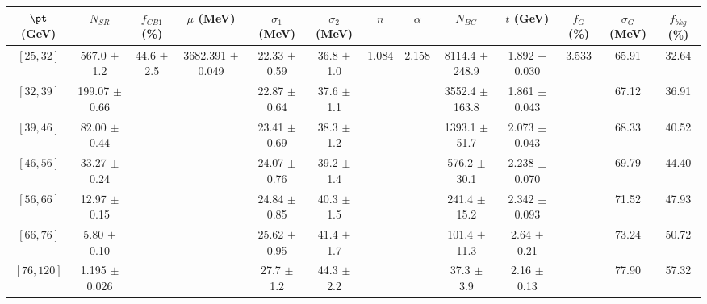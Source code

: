 \begin{tabular}{c||c|c|c|c|c|c|c|c|c|c|c||c}
$\pt$ (GeV) & $N_{SR}$ & $f_{CB1}$ (\%) & $\mu$ (MeV) & $\sigma_1$ (MeV) & $\sigma_2$ (MeV) & $n$ & $\alpha$ & $N_{BG}$ & $t$ (GeV) & $f_G$ (\%) & $\sigma_G$ (MeV) & $f_{bkg}$ (\%) \\
\hline
$[25, 32]$ & 567.0 $\pm$ 1.2 & \multirow{7}{*}{44.6 $\pm$ 2.5} & \multirow{7}{*}{3682.391 $\pm$ 0.049} & 22.33 $\pm$ 0.59 & 36.8 $\pm$ 1.0 & \multirow{7}{*}{1.084} & \multirow{7}{*}{2.158} & 8114.4 $\pm$ 248.9 & 1.892 $\pm$ 0.030 & \multirow{7}{*}{3.533} & 65.91 & 32.64\\
$[32, 39]$ & 199.07 $\pm$ 0.66 &  &  & 22.87 $\pm$ 0.64 & 37.6 $\pm$ 1.1 &  &  & 3552.4 $\pm$ 163.8 & 1.861 $\pm$ 0.043 &  & 67.12 & 36.91\\
$[39, 46]$ & 82.00 $\pm$ 0.44 &  &  & 23.41 $\pm$ 0.69 & 38.3 $\pm$ 1.2 &  &  & 1393.1 $\pm$ 51.7 & 2.073 $\pm$ 0.043 &  & 68.33 & 40.52\\
$[46, 56]$ & 33.27 $\pm$ 0.24 &  &  & 24.07 $\pm$ 0.76 & 39.2 $\pm$ 1.4 &  &  & 576.2 $\pm$ 30.1 & 2.238 $\pm$ 0.070 &  & 69.79 & 44.40\\
$[56, 66]$ & 12.97 $\pm$ 0.15 &  &  & 24.84 $\pm$ 0.85 & 40.3 $\pm$ 1.5 &  &  & 241.4 $\pm$ 15.2 & 2.342 $\pm$ 0.093 &  & 71.52 & 47.93\\
$[66, 76]$ & 5.80 $\pm$ 0.10 &  &  & 25.62 $\pm$ 0.95 & 41.4 $\pm$ 1.7 &  &  & 101.4 $\pm$ 11.3 & 2.64 $\pm$ 0.21 &  & 73.24 & 50.72\\
$[76, 120]$ & 1.195 $\pm$ 0.026 &  &  & 27.7 $\pm$ 1.2 & 44.3 $\pm$ 2.2 &  &  & 37.3 $\pm$ 3.9 & 2.16 $\pm$ 0.13 &  & 77.90 & 57.32\\
\end{tabular}
